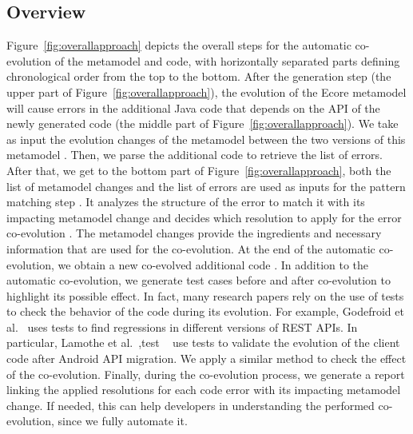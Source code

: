 \subsection{Overview}
\label{Overview}

Figure~\ref{fig:overallapproach} depicts the overall steps for the automatic co-evolution of the metamodel and code, with horizontally separated parts defining chronological order from the top to the bottom.
After the generation step (the upper part of Figure~\ref{fig:overallapproach}), the evolution of the Ecore metamodel will cause errors in the additional Java code that depends on the API of the newly generated code (the middle part of Figure~\ref{fig:overallapproach}). We take as input the evolution changes of the metamodel between the two versions of this metamodel {\small{}}. Then, we parse the additional code  {\small{}} to retrieve the list of errors. 
After that, we get to the bottom part of Figure~\ref{fig:overallapproach}, both the list of metamodel changes and the list of errors are used as inputs for the pattern matching step {\small{}}. It analyzes the structure of the error to match it with its impacting metamodel change and decides which resolution to apply for the error co-evolution {\small{}}. The metamodel changes provide the ingredients and necessary information that are used for the co-evolution.  
At the end of the automatic co-evolution, we obtain a new co-evolved additional code {\small{}}. 
In addition to the automatic co-evolution, we generate test cases before and after co-evolution to highlight its possible effect. In fact, many research papers rely on the use of tests to check the behavior of the code during its evolution. For example, Godefroid et al.~\cite{10.1145/3395363.3397374} uses tests to find regressions in different versions of REST APIs. In particular, Lamothe et al.~\cite{9079197},test ~\cite{10.1145/3387905.3388608} use tests to validate the evolution of the client code after Android API migration. We apply a similar method to check the effect of the co-evolution. \cite{10.5555/2486788.2486855}
Finally, during the co-evolution process, we generate a report linking the applied resolutions for each code error with its impacting metamodel change. If needed, this can help developers in understanding the performed co-evolution, since we fully automate it.
